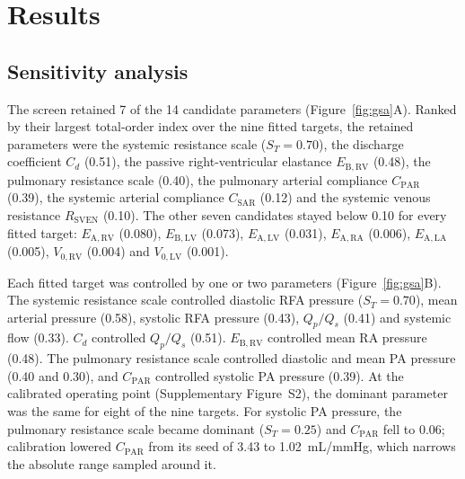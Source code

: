 \documentclass{article}
\begin{document}
\FloatBarrier
\section{Results}
\label{sec:results}

\subsection{Sensitivity analysis}
\label{sec:results_gsa}
The screen retained 7 of the 14 candidate parameters (Figure~\ref{fig:gsa}A). Ranked by their largest total-order index over the nine fitted targets, the retained parameters were the systemic resistance scale ($S_T = 0.70$), the discharge coefficient $C_d$ (0.51), the passive right-ventricular elastance $E_{\mathrm{B,RV}}$ (0.48), the pulmonary resistance scale (0.40), the pulmonary arterial compliance $C_{\mathrm{PAR}}$ (0.39), the systemic arterial compliance $C_{\mathrm{SAR}}$ (0.12) and the systemic venous resistance $R_{\mathrm{SVEN}}$ (0.10). The other seven candidates stayed below 0.10 for every fitted target: $E_{\mathrm{A,RV}}$ (0.080), $E_{\mathrm{B,LV}}$ (0.073), $E_{\mathrm{A,LV}}$ (0.031), $E_{\mathrm{A,RA}}$ (0.006), $E_{\mathrm{A,LA}}$ (0.005), $V_{0,\mathrm{RV}}$ (0.004) and $V_{0,\mathrm{LV}}$ (0.001).

Each fitted target was controlled by one or two parameters (Figure~\ref{fig:gsa}B). The systemic resistance scale controlled diastolic RFA pressure ($S_T = 0.70$), mean arterial pressure (0.58), systolic RFA pressure (0.43), $Q_p/Q_s$ (0.41) and systemic flow (0.33). $C_d$ controlled $Q_p/Q_s$ (0.51). $E_{\mathrm{B,RV}}$ controlled mean RA pressure (0.48). The pulmonary resistance scale controlled diastolic and mean PA pressure (0.40 and 0.30), and $C_{\mathrm{PAR}}$ controlled systolic PA pressure (0.39). At the calibrated operating point (Supplementary Figure~S2), the dominant parameter was the same for eight of the nine targets. For systolic PA pressure, the pulmonary resistance scale became dominant ($S_T = 0.25$) and $C_{\mathrm{PAR}}$ fell to 0.06; calibration lowered $C_{\mathrm{PAR}}$ from its seed of 3.43 to 1.02~mL/mmHg, which narrows the absolute range sampled around it.
\end{document}
